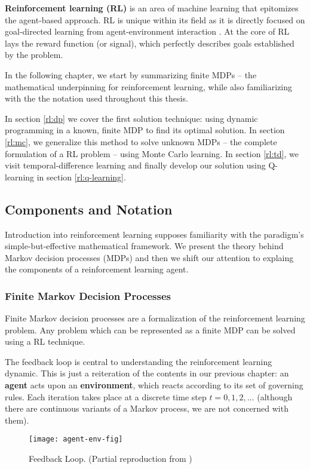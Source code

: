 \textbf{Reinforcement learning (RL)} is an area of machine learning that epitomizes the agent-based approach.
RL is unique within its field as it is directly focused on goal-directed learning from agent-environment interaction \cite{rlai}.
At the core of RL lays the reward function (or signal), which perfectly describes goals established by the problem.

In the following chapter, we start by summarizing finite MDPs -- the mathematical underpinning for reinforcement learning, while also familiarizing with the the notation used throughout this thesis.

In section \ref{rl:dp} we cover the first solution technique: using dynamic programming in a known, finite MDP to find its optimal solution.
In section \ref{rl:mc}, we generalize this method to solve unknown MDPs -- the complete formulation of a RL problem -- using Monte Carlo learning.
In section \ref{rl:td}, we visit temporal-difference learning and finally develop our solution using Q-learning in section \ref{rl:q-learning}.

\subsection{Components and Notation}
Introduction into reinforcement learning supposes familiarity with the paradigm's simple-but-effective mathematical framework.
We present the theory behind Markov decision processes (MDPs) and then we shift our attention to explaing the components of a reinforcement learning agent.

\subsubsection{Finite Markov Decision Processes}
Finite Markov decision processes are a formalization of the reinforcement learning problem.
Any problem which can be represented as a finite MDP can be solved using a RL technique.

The feedback loop is central to understanding the reinforcement learning dynamic.
This is just a reiteration of the contents in our previous chapter:
an \textbf{agent} acts upon an \textbf{environment}, which reacts according to its set of governing rules.
Each iteration takes place at a discrete time step \(t = 0,1,2,\dots \) (although there are continuous variants of a Markov process, we are not concerned with them).

\begin{figure}[ht]
    \centering
    \caption{Feedback Loop. (Partial reproduction from \cite{rlai})}
    \vspace*{0.2cm}
    \texttt{[image: agent-env-fig]}
\end{figure}

